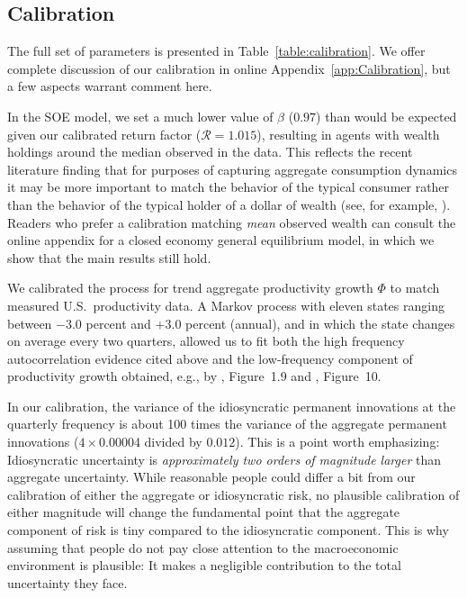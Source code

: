 \documentclass[titlepage]{./econtex}
\begin{document}
\subsection{Calibration}\label{sec:calibration}

The full set of parameters is presented in Table~\ref{table:calibration}.  We offer complete discussion of our calibration in online Appendix~\ref{app:Calibration}, but a few aspects warrant comment here.

In the SOE model, we set a much lower value of $\beta$ ($ %
0.97 %
 $) than would be expected given our calibrated return factor (${\mathscr{R}} = 1.015$), resulting in agents with wealth holdings around the median observed in the data.  This reflects the recent literature finding that for purposes of capturing aggregate consumption dynamics it may be more important to match the behavior of the typical consumer rather than the behavior of the typical holder of a dollar of wealth (see, for example, \cite{opLiquidH2M}).  Readers who prefer a calibration matching \textit{mean} observed wealth can consult the online appendix for a closed economy general equilibrium model, in which we show that the main results still hold.

We calibrated the process for trend aggregate productivity growth $\Phi$ to match measured U.S.\ productivity data.  A Markov process with eleven states ranging between $-3.0$ percent and $+3.0$ percent (annual), and in which the state changes on average every two quarters, allowed us to fit both the high frequency autocorrelation evidence cited above and the low-frequency component of productivity growth obtained, e.g., by \cite{sswNAIRU}, Figure~1.9 and \cite{fernald:disappointingRecovery}, Figure~10.

In our calibration, the variance of the idiosyncratic permanent innovations at the quarterly frequency is about 100 times the variance of the aggregate permanent innovations ($4 \times $0.00004 divided by $%
0.012 %
 $).  This is a point worth emphasizing: Idiosyncratic uncertainty is {\it approximately two orders of magnitude larger} than aggregate uncertainty.  While reasonable people could differ a bit from our calibration of either the aggregate or idiosyncratic risk, no plausible calibration of either magnitude will change the fundamental point that the aggregate component of risk is tiny compared to the idiosyncratic component.  This is why assuming that people do not pay close attention to the macroeconomic environment is plausible: It makes a negligible contribution to the total uncertainty they face.
\end{document}
